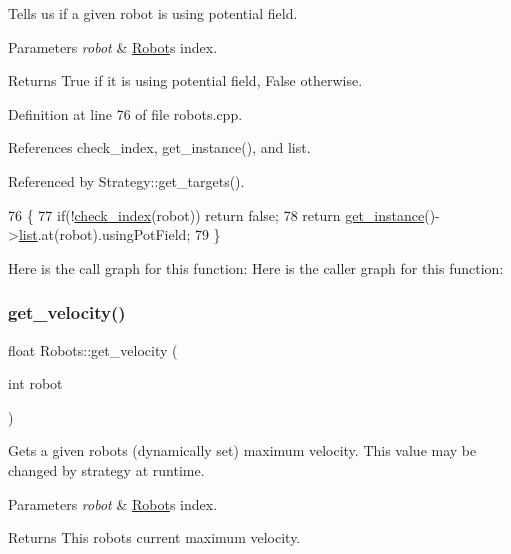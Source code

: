 Tells us if a given robot is using potential field. 
\begin{DoxyParams}{Parameters}
{\em robot} & \hyperlink{struct_robots_1_1_robot}{Robot}\textquotesingle{}s index. \\
\hline
\end{DoxyParams}
\begin{DoxyReturn}{Returns}
True if it is using potential field, False otherwise. 
\end{DoxyReturn}


Definition at line 76 of file robots.\+cpp.



References check\+\_\+index, get\+\_\+instance(), and list.



Referenced by Strategy\+::get\+\_\+targets().


\begin{DoxyCode}
76                                         \{
77     \textcolor{keywordflow}{if}(!\hyperlink{robots_8hpp_ae3e6ae8f87cdc750c0b99bc609d9ae43}{check\_index}(robot)) \textcolor{keywordflow}{return} \textcolor{keyword}{false};
78     \textcolor{keywordflow}{return} \hyperlink{class_robots_a589bce74db5f34af384952d48435168f}{get\_instance}()->\hyperlink{class_robots_a2c6b77265028f82a4342ca1ef15ed305}{list}.at(robot).usingPotField;
79 \}
\end{DoxyCode}
Here is the call graph for this function\+:
Here is the caller graph for this function\+:
\mbox{\label{class_robots_ac2b2d9709dd5d86723d9dc00dddaabaf}} 
\subsubsection{\texorpdfstring{get\+\_\+velocity()}{get\_velocity()}}
{\footnotesize\ttfamily float Robots\+::get\+\_\+velocity (\begin{DoxyParamCaption}\item[{int}]{robot }\end{DoxyParamCaption})\hspace{0.3cm}{\ttfamily [static]}}

Gets a given robot\textquotesingle{}s (dynamically set) maximum velocity. This value may be changed by strategy at runtime. 
\begin{DoxyParams}{Parameters}
{\em robot} & \hyperlink{struct_robots_1_1_robot}{Robot}\textquotesingle{}s index. \\
\hline
\end{DoxyParams}
\begin{DoxyReturn}{Returns}
This robot\textquotesingle{}s current maximum velocity. 
\end{DoxyReturn}


